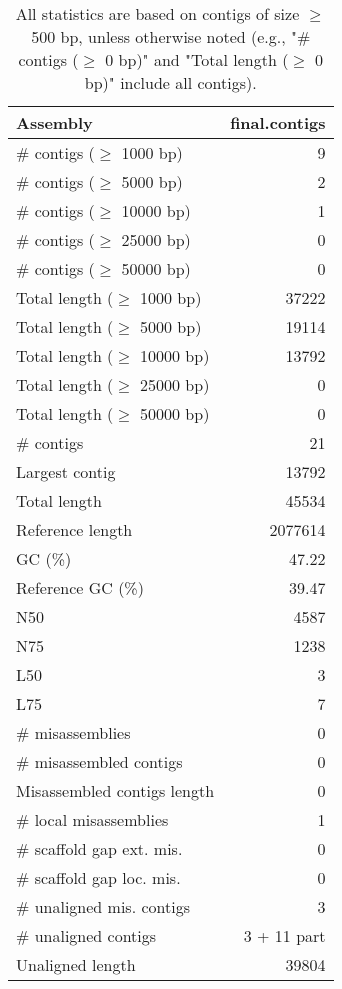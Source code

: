 \documentclass[12pt,a4paper]{article}
\begin{document}
\begin{table}[ht]
\begin{center}
\caption{All statistics are based on contigs of size $\geq$ 500 bp, unless otherwise noted (e.g., "\# contigs ($\geq$ 0 bp)" and "Total length ($\geq$ 0 bp)" include all contigs).}
\begin{tabular}{|l*{1}{|r}|}
\hline
Assembly & final.contigs \\ \hline
\# contigs ($\geq$ 1000 bp) & 9 \\ \hline
\# contigs ($\geq$ 5000 bp) & 2 \\ \hline
\# contigs ($\geq$ 10000 bp) & 1 \\ \hline
\# contigs ($\geq$ 25000 bp) & 0 \\ \hline
\# contigs ($\geq$ 50000 bp) & 0 \\ \hline
Total length ($\geq$ 1000 bp) & 37222 \\ \hline
Total length ($\geq$ 5000 bp) & 19114 \\ \hline
Total length ($\geq$ 10000 bp) & 13792 \\ \hline
Total length ($\geq$ 25000 bp) & 0 \\ \hline
Total length ($\geq$ 50000 bp) & 0 \\ \hline
\# contigs & 21 \\ \hline
Largest contig & 13792 \\ \hline
Total length & 45534 \\ \hline
Reference length & 2077614 \\ \hline
GC (\%) & 47.22 \\ \hline
Reference GC (\%) & 39.47 \\ \hline
N50 & 4587 \\ \hline
N75 & 1238 \\ \hline
L50 & 3 \\ \hline
L75 & 7 \\ \hline
\# misassemblies & 0 \\ \hline
\# misassembled contigs & 0 \\ \hline
Misassembled contigs length & 0 \\ \hline
\# local misassemblies & 1 \\ \hline
\# scaffold gap ext. mis. & 0 \\ \hline
\# scaffold gap loc. mis. & 0 \\ \hline
\# unaligned mis. contigs & 3 \\ \hline
\# unaligned contigs & 3 + 11 part \\ \hline
Unaligned length & 39804 \\ \hline

\end{tabular}
\end{center}
\end{table}
\end{document}
